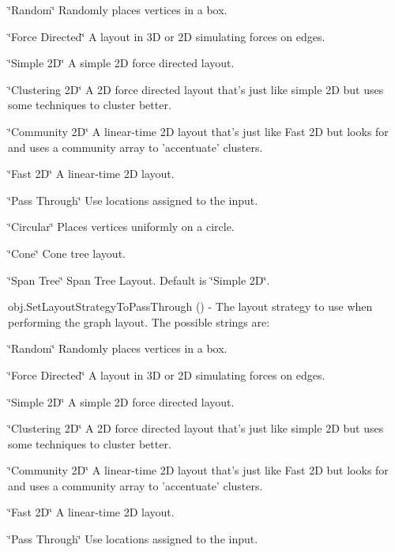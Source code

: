 \begin{DoxyItemize}
\begin{DoxyItemize}
\item \char`\"{}\-Random\char`\"{} Randomly places vertices in a box.
\item \char`\"{}\-Force Directed\char`\"{} A layout in 3\-D or 2\-D simulating forces on edges.
\item \char`\"{}\-Simple 2\-D\char`\"{} A simple 2\-D force directed layout.
\item \char`\"{}\-Clustering 2\-D\char`\"{} A 2\-D force directed layout that's just like simple 2\-D but uses some techniques to cluster better.
\item \char`\"{}\-Community 2\-D\char`\"{} A linear-\/time 2\-D layout that's just like Fast 2\-D but looks for and uses a community array to 'accentuate' clusters.
\item \char`\"{}\-Fast 2\-D\char`\"{} A linear-\/time 2\-D layout.
\item \char`\"{}\-Pass Through\char`\"{} Use locations assigned to the input.
\item \char`\"{}\-Circular\char`\"{} Places vertices uniformly on a circle.
\item \char`\"{}\-Cone\char`\"{} Cone tree layout.
\item \char`\"{}\-Span Tree\char`\"{} Span Tree Layout. Default is \char`\"{}\-Simple 2\-D\char`\"{}.  
\end{DoxyItemize}
\item {\ttfamily obj.\-Set\-Layout\-Strategy\-To\-Pass\-Through ()} -\/ The layout strategy to use when performing the graph layout. The possible strings are\-:
\begin{DoxyItemize}
\item \char`\"{}\-Random\char`\"{} Randomly places vertices in a box.
\item \char`\"{}\-Force Directed\char`\"{} A layout in 3\-D or 2\-D simulating forces on edges.
\item \char`\"{}\-Simple 2\-D\char`\"{} A simple 2\-D force directed layout.
\item \char`\"{}\-Clustering 2\-D\char`\"{} A 2\-D force directed layout that's just like simple 2\-D but uses some techniques to cluster better.
\item \char`\"{}\-Community 2\-D\char`\"{} A linear-\/time 2\-D layout that's just like Fast 2\-D but looks for and uses a community array to 'accentuate' clusters.
\item \char`\"{}\-Fast 2\-D\char`\"{} A linear-\/time 2\-D layout.
\item \char`\"{}\-Pass Through\char`\"{} Use locations assigned to the input.

\end{DoxyItemize}
\end{DoxyItemize}
